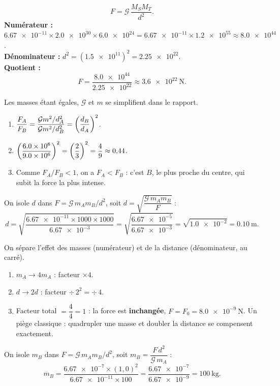 \documentclass[11pt,a4paper]{article}
\begin{document}

\begin{corrige}
\[
F=\mathcal{G}\,\frac{M_S M_T}{d^2}.
\]
\textbf{Numérateur :} $\num{6.67e-11}\times\num{2.0e30}\times\num{6.0e24}
=\num{6.67e-11}\times\num{1.2e55}\approx\num{8.0e44}$.\\
\textbf{Dénominateur :} $d^2=(\num{1.5e11})^2=\num{2.25e22}$.\\
\textbf{Quotient :}
\[
F=\frac{\num{8.0e44}}{\num{2.25e22}}\approx\qty{3.6e22}{\newton}.
\]
\end{corrige}

\begin{corrige}
Les masses étant égales, $\mathcal{G}$ et $m$ se simplifient dans le rapport.
\begin{enumerate}[label=\alph*)]
  \item $\displaystyle \frac{F_A}{F_B}=\frac{\mathcal{G}m^2/d_A^2}{\mathcal{G}m^2/d_B^2}
        =\left(\frac{d_B}{d_A}\right)^2$.
  \item $\displaystyle \left(\frac{\num{6.0e6}}{\num{9.0e6}}\right)^2=\left(\frac23\right)^2
        =\frac49\approx 0{,}44$.
  \item Comme $F_A/F_B<1$, on a $F_A<F_B$ : c'est \textbf{$B$}, le plus proche du centre,
        qui subit la force la plus intense.
\end{enumerate}
\end{corrige}

\begin{corrige}
On isole $d$ dans $F=\mathcal{G}\,m_A m_B/d^2$, soit $d=\sqrt{\dfrac{\mathcal{G}\,m_A m_B}{F}}$ :
\[
d=\sqrt{\frac{\num{6.67e-11}\times 1000\times 1000}{\num{6.67e-3}}}
 =\sqrt{\frac{\num{6.67e-5}}{\num{6.67e-3}}}
 =\sqrt{\num{1.0e-2}}=\qty{0.10}{\metre}.
\]
\end{corrige}

\begin{corrige}
On sépare l'effet des masses (numérateur) et de la distance (dénominateur, au carré).
\begin{enumerate}[label=\alph*)]
  \item $m_A\to 4m_A$ : facteur $\times 4$.
  \item $d\to 2d$ : facteur $\div\,2^2=\div\,4$.
  \item Facteur total $=\dfrac{4}{4}=1$ : la force est \textbf{inchangée},
        $F=F_0=\qty{8.0e-9}{\newton}$. Un piège classique : quadrupler une masse et
        doubler la distance se compensent exactement.
\end{enumerate}
\end{corrige}

\begin{corrige}
On isole $m_B$ dans $F=\mathcal{G}\,m_A m_B/d^2$, soit $m_B=\dfrac{F\,d^2}{\mathcal{G}\,m_A}$ :
\[
m_B=\frac{\num{6.67e-7}\times(1{,}0)^2}{\num{6.67e-11}\times 100}
   =\frac{\num{6.67e-7}}{\num{6.67e-9}}=\qty{100}{\kilogram}.
\]
\end{corrige}
\end{document}
